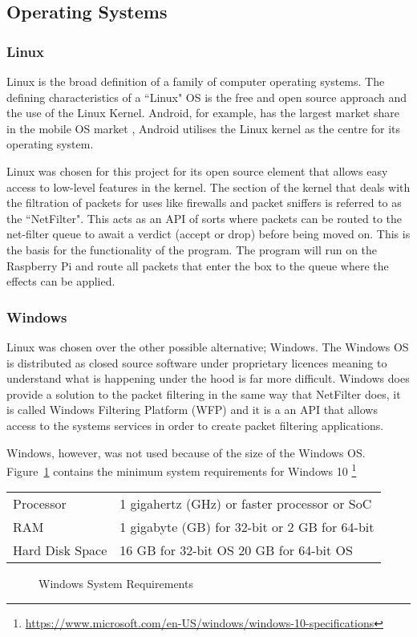 \subsection{Operating Systems}

\subsubsection{Linux}
Linux is the broad definition of a family of computer operating systems. The defining characteristics of a ``Linux" OS is the free and open source approach and the use of the Linux Kernel. Android, for example, has the largest market share in the mobile OS market \citep{share2015desktop}, Android utilises the Linux kernel as the centre for its operating system.

Linux was chosen for this project for its open source element that allows easy access to low-level features in the kernel. The section of the kernel that deals with the filtration of packets for uses like firewalls and packet sniffers is referred to as the ``NetFilter". This acts as an API of sorts where packets can be routed to the net-filter queue to await a verdict (accept or drop) before being moved on. This is the basis for the functionality of the program. The program will run on the Raspberry Pi and route all packets that enter the box to the queue where the effects can be applied.


\subsubsection{Windows}
\label{ref:Windows}
Linux was chosen over the other possible alternative; Windows. The Windows OS is distributed as closed source software under proprietary licences meaning to understand what is happening under the hood is far more difficult. Windows does provide a solution to the packet filtering in the same way that NetFilter does, it is called Windows Filtering Platform (WFP) and it is a an API that allows access to the systems services in order to create packet filtering applications.

Windows, however, was not used because of the size of the Windows OS. Figure~\ref{ref:windowsRequire} contains the minimum system requirements for Windows 10 \footnote{\url{https://www.microsoft.com/en-US/windows/windows-10-specifications}}


\vspace{5mm} 
\begin{center}
\begin{tabular}{| l | l |}
	\hline
	Processor & 1 gigahertz (GHz) or faster processor or SoC \\
	RAM & 1 gigabyte (GB) for 32-bit or 2 GB for 64-bit \\
	Hard Disk Space & 16 GB for 32-bit OS 20 GB for 64-bit OS \\
	\hline
\end{tabular}
\begin{figure}[h]
		\caption{Windows System Requirements}
	\label{ref:windowsRequire}
	\end{figure}
\end{center}

